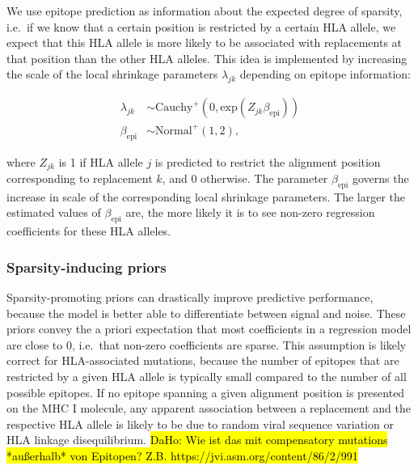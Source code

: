 \documentclass{bioinfo}
\begin{document}
\begin{methods}
We use epitope prediction as information about the expected degree of sparsity, i.e.\ if we know that a certain position is restricted by a certain HLA allele, we expect that this HLA allele is more likely to be associated with replacements at that position than the other HLA alleles. This idea is implemented by increasing the scale of the local shrinkage parameters \(\lambda_{jk}\) depending on epitope information:

\begin{equation}
  \begin{aligned}
    \lambda_{jk} &\sim \text{Cauchy}^{+}(0, \text{exp}(Z_{jk}\beta_{\text{epi}})) \\
    \beta_{\text{epi}} &\sim \text{Normal}^{+}(1, 2),
  \end{aligned}
\end{equation}
 
where \(Z_{jk}\) is 1 if HLA allele \(j\) is predicted to restrict the alignment position corresponding to replacement \(k\), and 0 otherwise. The parameter \(\beta_{\text{epi}}\) governs the increase in scale of the  corresponding local shrinkage parameters. The larger the estimated values of \(\beta_{\text{epi}}\) are, the more likely it is to see non-zero regression coefficients for these HLA alleles.


\subsubsection{Sparsity-inducing priors}
  
Sparsity-promoting priors \citep{Piironen2017} can drastically improve predictive performance, because the model is better able to differentiate between signal and noise. These priors convey the a priori expectation that most coefficients in a regression model are close to 0, i.e.\ that non-zero coefficients are sparse. This assumption is likely correct for HLA-associated mutations, because the number of epitopes that are restricted by a given HLA allele is typically small compared to the number of all possible epitopes. If no epitope spanning a given alignment position is presented on the MHC I molecule, any apparent association between a replacement and the respective HLA allele is likely to be due to random viral sequence variation or HLA linkage disequilibrium. \hl{DaHo: Wie ist das mit compensatory mutations *außerhalb* von Epitopen? Z.B. https://jvi.asm.org/content/86/2/991}
  

\end{methods}
\end{document}
